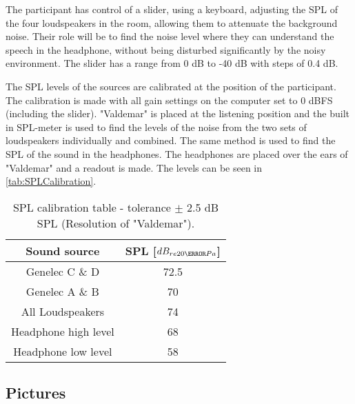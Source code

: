 The participant has control of a slider, using a keyboard, adjusting the SPL of the four loudspeakers in the room, allowing them to attenuate the background noise. Their role will be to find the noise level where they can understand the speech in the headphone, without being disturbed significantly by the noisy environment. The slider has a range from 0 dB to -40 dB with steps of 0.4 dB. 

The SPL levels of the sources are calibrated at the position of the participant. The calibration is made with all gain settings on the computer set to 0 dBFS (including the slider). "Valdemar" is placed at the listening position and the built in SPL-meter is used to find the levels of the noise from the two sets of loudspeakers individually and combined. 
The same method is used to find the SPL of the sound in the headphones. The headphones are placed over the ears of "Valdemar" and a readout is made. The levels can be seen in \autoref{tab:SPLCalibration}.

\begin{table} [H]
\centering
\label{SPLtableNA}
	\begin{tabular}{c c}											\toprule
		Sound source				& 	SPL [$dB_{re20\micro Pa}$]	\\ 	\bottomrule
		Genelec C \& D				& 	72.5					\\
		Genelec A \& B				&	70						\\
		All Loudspeakers				&	74						\\
		Headphone high level		&	68						\\ 	
		Headphone low level			&	58						\\	\bottomrule
	\end{tabular}
	\caption{SPL calibration table - tolerance $\pm$ 2.5 dB SPL (Resolution of "Valdemar").}
	\label{tab:SPLCalibration}
\end{table}   



\subsection{Pictures}

